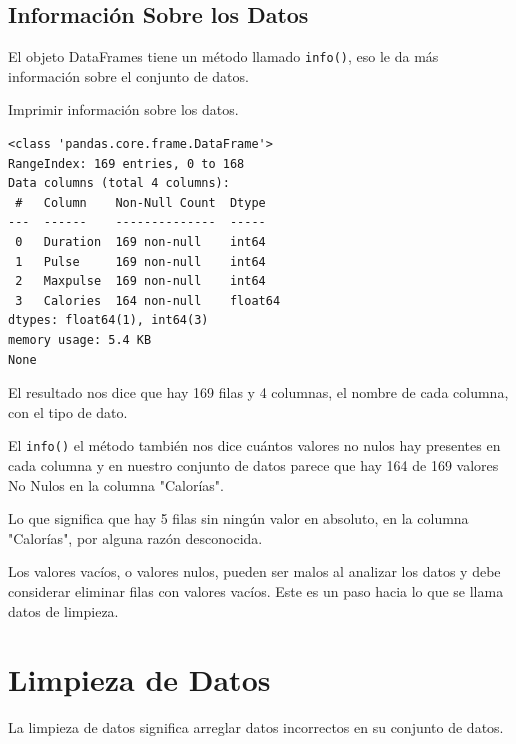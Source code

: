 \subsection{Información Sobre los Datos}

El objeto DataFrames tiene un método llamado \texttt{info()}, eso le da
más información sobre el conjunto de datos.\\

\begin{code} Imprimir información sobre los datos.

\begin{Shaded}
\begin{Highlighting}[]
\end{Highlighting}
\end{Shaded}

\begin{verbatim}
<class 'pandas.core.frame.DataFrame'>
RangeIndex: 169 entries, 0 to 168
Data columns (total 4 columns):
 #   Column    Non-Null Count  Dtype  
---  ------    --------------  -----  
 0   Duration  169 non-null    int64  
 1   Pulse     169 non-null    int64  
 2   Maxpulse  169 non-null    int64  
 3   Calories  164 non-null    float64
dtypes: float64(1), int64(3)
memory usage: 5.4 KB
None
\end{verbatim}
\end{code}

El resultado nos dice que hay 169 filas y 4 columnas, el nombre de cada
columna, con el tipo de dato.

El \texttt{info()} el método también nos dice cuántos valores no nulos
hay presentes en cada columna y en nuestro conjunto de datos parece que
hay 164 de 169 valores No Nulos en la columna "Calorías".

Lo que significa que hay 5 filas sin ningún valor en absoluto, en la
columna "Calorías", por alguna razón desconocida.

Los valores vacíos, o valores nulos, pueden ser malos al analizar los
datos y debe considerar eliminar filas con valores vacíos. Este es un
paso hacia lo que se llama datos de limpieza.

\section{Limpieza de Datos}

La limpieza de datos significa arreglar datos incorrectos en su conjunto
de datos.

